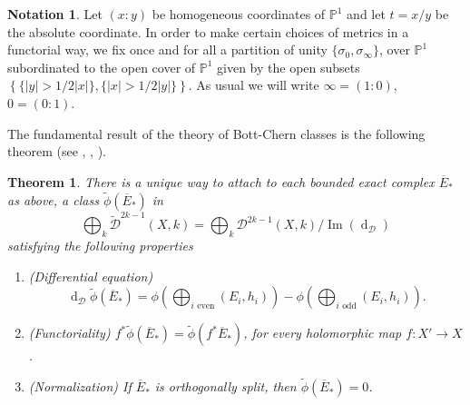 \documentclass[10pt,twoside]{article}
\numberwithin{equation}{section}
\theoremstyle{plain}
\newtheorem{theorem}[equation]{Theorem}
\theoremstyle{definition}
\newtheorem{notation}[equation]{Notation}
\DeclareMathOperator{\dd}{d}
\DeclareMathOperator{\Img}{Im}
\begin{document}
\begin{notation}
  \label{def:3}
  Let $(x:y)$ be homogeneous coordinates of $\mathbb{P}^{1}$ and let
  $t=x/y$ be the absolute coordinate. In order to make certain choices
  of metrics in a functorial way, we fix once and for all a partition of
  unity $\{\sigma _{0},\sigma _{\infty}\}$, over $\mathbb{P}^{1}$
  subordinated to the open cover of $\mathbb{P}^{1}$ given by the open
  subsets $\left\{\{|y|>1/2|x|\},
    \{|x|>1/2|y|\}\right\}$. As usual we will write $\infty =(1:0)$, $0=(0:1)$.
\end{notation}


The fundamental result of the theory of Bott-Chern classes is the
following theorem (see \cite{BottChern:hvb}, \cite{BismutGilletSoule:at},
\cite{GilletSoule:vbhm}).

\begin{theorem}
\label{thm:3}
There is a unique way to attach to each bounded exact complex
$\overline{E}_{\ast}$ as above, a class $\widetilde{\phi}(\overline{E}_{\ast})$ in
\begin{displaymath}
\bigoplus_{k}\widetilde{\mathcal{D}}^{2k-1}(X,k)=\bigoplus_{k}
\mathcal{D}^{2k-1}(X,k)/\Img(\dd_{\mathcal{D}})
\end{displaymath}
satisfying the following properties
\begin{enumerate}
\item \label{item:12} (Differential equation)
  \begin{equation}
    \label{eq:13}
    \dd_{\mathcal{D}}\widetilde{\phi}(\overline{E}_{\ast})=
    \phi
    (\bigoplus_{i\text{ even}}(E_{i},h_{i}))- 
    \phi
    (\bigoplus_{i\text{ odd}}(E_{i},h_{i})).   
  \end{equation}
\item \label{item:13} (Functoriality)
$f^{\ast}\widetilde{\phi}(\overline{E}_{\ast})=\widetilde{\phi}
(f^{\ast}\overline{E}_{\ast})$, for every holomorphic map $f\colon X'
\longrightarrow X$. 
\item \label{item:14} (Normalization)
If $\overline {E}_{\ast}$ is orthogonally split, then $\widetilde 
{\phi}(\overline{E}_{\ast})=0$.
\end{enumerate}
\end{theorem}
\end{document}

